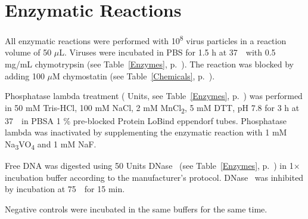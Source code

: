 
\section{Enzymatic Reactions}
 
All enzymatic reactions were performed with 10\textsuperscript{8} virus particles in a reaction volume of 50 $\mu$L. Viruses were incubated in PBS for 1.5 h at 37~\textcelsius~with 0.5 mg/mL chymotrypsin (see Table~\ref{Enzymes}, p.~\pageref{Enzymes}). The reaction was blocked by adding 100 $\mu$M chymostatin (see Table~\ref{Chemicals}, p.~\pageref{Chemicals}). 

Phosphatase lambda treatment ( Units, see Table~\ref{Enzymes}, p.~\pageref{Enzymes}) was performed in 50 mM Tris-HCl, 100 mM NaCl, 2 mM MnCl\textsubscript{2}, 5 mM DTT, pH 7.8 for 3 h at 37~\textcelsius~in PBSA 1 \% pre-blocked Protein LoBind eppendorf tubes. Phosphatase lambda was inactivated by supplementing the enzymatic reaction with 1 mM Na\textsubscript{3}VO\textsubscript{4} and 1 mM NaF. 

Free DNA was digested using 50 Units DNase~ (see Table~\ref{Enzymes}, p.~\pageref{Enzymes}) in 1$\times$ incubation buffer according to the manufacturer’s protocol. DNase~ was inhibited by incubation at 75~\textcelsius~for 15 min. 

Negative controls were incubated in the same buffers for the same time.





